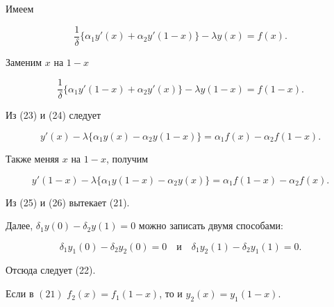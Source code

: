 \begin{pf}


Имеем


\begin{equation}


\frac 1\delta\{ \alpha_1y'(x)+\alpha_2y'


(1-x)\}-\lambda y(x)=f(x).


\end{equation}


Заменим $x$ на $1-x$


\begin{equation}


\frac 1\delta\{\alpha_1y'(1-x)+\alpha_2y'(x)\}-\lambda y(1-x)=f(1-x).


\end{equation}


Из (23) и (24) следует


\begin{equation}


y'(x)-\lambda\{\alpha_1y(x)-\alpha_2y(1-x)\}=\alpha_1f(x)-\alpha_2f(1-x).


\end{equation}


Также меняя $x$ на $1-x$, получим


\begin{equation}


y'(1-x)-\lambda\{\alpha_1y(1-x)-\alpha_2y(x)\}=\alpha_1f(1-x)-\alpha_2f(x).


\end{equation}


Из (25) и (26) вытекает (21).


Далее, $\delta_1y(0)-\delta_2y(1)=0$ можно записать двумя способами:


$$


\delta_1y_1(0)-\delta_2y_2(0)=0\quad


\text{и}\quad


\delta_1y_2(1)-\delta_2y_1(1)=0.


$$


Отсюда следует (22).


\end{pf}





\begin{lem}


Если в $(21)$ $f_2(x)=f_1(1-x)$, то и $y_2(x)=y_1(1-x)$.


\end{lem}





